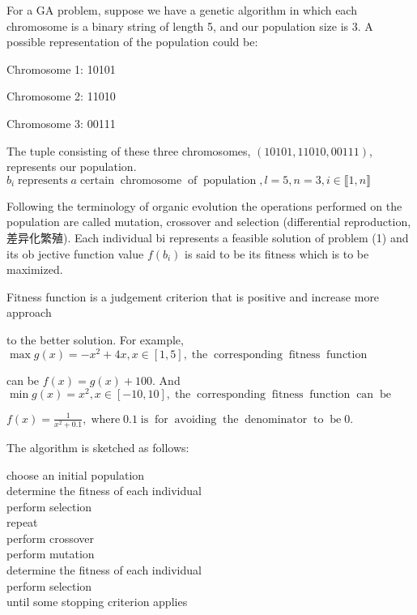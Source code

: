 \documentclass{article}
\newcommand{\tmop}[1]{\ensuremath{\operatorname{#1}}}
\begin{document}
\begin{example}
  For a GA problem, suppose we have a genetic algorithm in which each
  chromosome is a binary string of length 5, and our population size is 3. A
  possible representation of the population could be:
  
  Chromosome 1: 10101
  
  Chromosome 2: 11010
  
  Chromosome 3: 00111
  
  The tuple consisting of these three chromosomes, $(10101, 11010, 00111)$,
  represents our population. $b_i \tmop{represents} a \tmop{certain}
  \tmop{chromosome} \tmop{of} \tmop{population}, l = 5, n = 3, i \in
  \llbracket 1, n \rrbracket$
\end{example}

Following the terminology of organic evolution the operations performed on the
population are called mutation, crossover and selection (differential
reproduction,差异化繁殖). Each individual bi represents a feasible
solution of problem (1) and its ob jective function value $f (b_i)$ is said to
be its fitness which is to be maximized.

\begin{remark}
  Fitness function is a judgement criterion that is positive and increase more
  approach
  
  to the better solution. For example, $\max g (x) = - x^2 + 4 x, x \in [1,
  5], \tmop{the} \tmop{corresponding} \tmop{fitness} \tmop{function}$
  
  can be $f (x) = g (x) + 100.$ And $\min g (x) = x^2, x \in [- 10, 10],
  \tmop{the} \tmop{corresponding} \tmop{fitness} \tmop{function} \tmop{can}
  \tmop{be}$
  
  $f (x) = \frac{1}{x^2 + 0.1}, \tmop{where} 0.1 \tmop{is} \tmop{for}
  \tmop{avoiding} \tmop{the} \tmop{denominator} \tmop{to} \tmop{be} 0.$
\end{remark}

The algorithm is sketched as follows:

choose an initial population\\
determine the fitness of each individual\\
perform selection\\
repeat\\
perform crossover\\
perform mutation\\
determine the fitness of each individual\\
perform selection\\
until some stopping criterion applies\\
\end{document}
